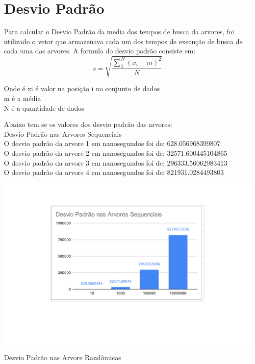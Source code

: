 \section{Desvio Padrão}
Para calcular o Desvio Padrão da media dos tempos de busca da arvores, foi utilizado o vetor que armazenava cada um dos tempos de execução de busca de cada uma das arvores. A formula do desvio padrão consiste em:
    \begin{equation}
        s = \sqrt{\frac{\sum_{1}^N (x_i - m)^2}{N}}
    \end{equation}
            \begin{center}
            Onde é xi é valor na posição i no conjunto de dados\\
            m é a média\\
            N é a quantidade de dados\\
        \end{center}
Abaixo tem se os valores dos desvio padrão das arvores:\\
Desvio Padrão nas Arvores Sequenciais\\
O desvio padrão da arvore 1 em nanosegundos foi de: 628.056968399807\\
O desvio padrão da arvore 2 em nanosegundos foi de: 32571.600445104865\\
O desvio padrão da arvore 3 em nanosegundos foi de: 296333.56062983413\\
O desvio padrão da arvore 4 em nanosegundos foi de: 821931.0284493803
    \begin{center}
            \includegraphics[scale=0.8]{Trabalho AED/fig/grafico8.pdf}
            \label{fig:Grafico 8}
    \end{center}
\pagebreak
Desvio Padrão nas Arvore Randômicas\\

